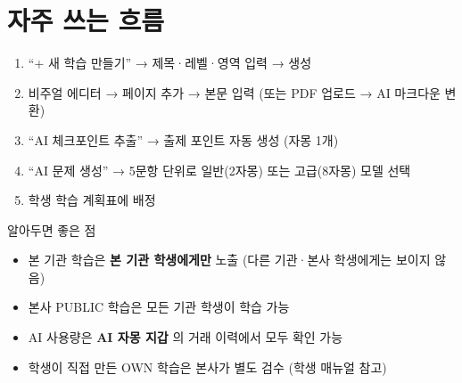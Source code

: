 \section*{자주 쓰는 흐름}
\begin{enumerate}
  \item ``+ 새 학습 만들기'' → 제목·레벨·영역 입력 → 생성
  \item 비주얼 에디터 → 페이지 추가 → 본문 입력 (또는 PDF 업로드 → AI 마크다운 변환)
  \item ``AI 체크포인트 추출'' → 출제 포인트 자동 생성 (자몽 1개)
  \item ``AI 문제 생성'' → 5문항 단위로 일반(2자몽) 또는 고급(8자몽) 모델 선택
  \item 학생 학습 계획표에 배정
\end{enumerate}

\begin{tipbox}{알아두면 좋은 점}
\begin{itemize}[leftmargin=1.2em]
  \item 본 기관 학습은 \textbf{본 기관 학생에게만} 노출 (다른 기관·본사 학생에게는 보이지 않음)
  \item 본사 PUBLIC 학습은 모든 기관 학생이 학습 가능
  \item AI 사용량은 \textbf{AI 자몽 지갑} 의 거래 이력에서 모두 확인 가능
  \item 학생이 직접 만든 OWN 학습은 본사가 별도 검수 (학생 매뉴얼 참고)
\end{itemize}
\end{tipbox}
